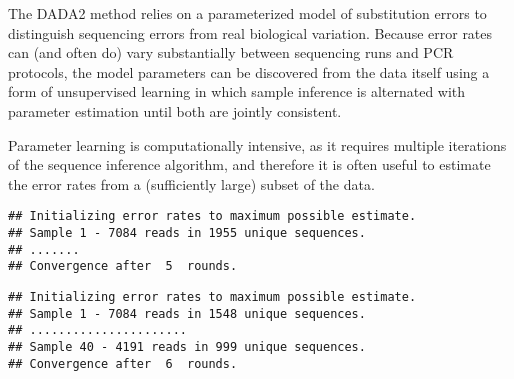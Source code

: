 The DADA2 method relies on a parameterized model of substitution
errors to distinguish sequencing errors from real biological
variation. Because error rates can (and often do) vary substantially
between sequencing runs and PCR protocols, the model parameters can be
discovered from the data itself using a form of unsupervised learning
in which sample inference is alternated with parameter estimation
until both are jointly consistent. 

Parameter learning is computationally intensive, as it requires
multiple iterations of the sequence inference algorithm, and therefore
it is often useful to estimate the error rates from a (sufficiently
large) subset of the data.

\begin{knitrout}
\color{fgcolor}\begin{kframe}
\begin{alltt}
 \hlkwb{<-} \hlstd{(derepFs[}\hlopt{:}\hlstd{],} \hlstd{=}\hlstd{,} \hlstd{=}\hlstd{)}
\end{alltt}


{\ttfamily\noindent\itshape\color{messagecolor}{\#\# Initial error matrix unspecified. Error rates will be initialized to the maximum possible estimate from this data.}}\begin{verbatim}
## Initializing error rates to maximum possible estimate.
## Sample 1 - 7084 reads in 1955 unique sequences.
## .......
## Convergence after  5  rounds.
\end{verbatim}
\begin{alltt}
 \hlkwb{<-} \hlstd{(derepRs[}\hlopt{:}\hlstd{],} \hlstd{=}\hlstd{,} \hlstd{=}\hlstd{)}
\end{alltt}


{\ttfamily\noindent\itshape\color{messagecolor}{\#\# Initial error matrix unspecified. Error rates will be initialized to the maximum possible estimate from this data.}}\begin{verbatim}
## Initializing error rates to maximum possible estimate.
## Sample 1 - 7084 reads in 1548 unique sequences.
## ......................
## Sample 40 - 4191 reads in 999 unique sequences.
## Convergence after  6  rounds.
\end{verbatim}
\end{kframe}
\end{knitrout}

